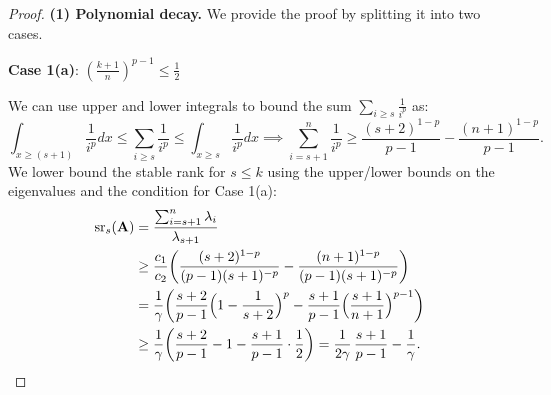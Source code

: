 \documentclass{article}
\begin{document}
\begin{proof}
  
  
  
\textbf{  (1) Polynomial decay.} We provide the proof by splitting it into two cases. 
  
  
  \textbf{Case 1(a)}: $\left(\frac{k+1}{n}\right)^{p-1} \leq \frac{1}{2} $
  
  We can use upper and lower integrals to bound the sum $\sum_{i\geq s}\frac{1}{i^p}$ as:
  \[ \int_{x\geq (s+1)}\frac{1}{i^p}dx \leq \sum_{i\geq
      s}\frac{1}{i^p} \leq \int_{x\geq s}\frac{1}{i^p}dx
    \implies \sum_{i=s+1}^n\frac{1}{i^p}
    \geq \frac{(s+2)^{1-p}}{p-1} -  \frac{(n+1)^{1-p}}{p-1}.\] 
  We lower bound the stable rank for $s\leq k$ using the upper/lower bounds on
  the eigenvalues and the condition for Case 1(a):
  \begin{align*}
    {\mathrm{sr}}_s(\mathbf A)&=\frac{\sum_{i=s+1}^n\lambda_i}{\lambda_{s+1}}\\
    &\geq
    \frac{c_1}{c_2}\bigg(\frac{(s+2)^{1-p}}{(p-1)(s+1)^{-p}}-
    \frac{(n+1)^{1-p}}{(p-1)(s+1)^{-p}}\bigg) \\
    &=\frac1\gamma\bigg(\frac{s+2}{p-1} \Big(1 - \frac1{s+2}\Big)^p
      -  \frac{s+1}{p-1}\Big(\frac{s+1}{n+1}\Big)^{p-1}\bigg)\\
    &\geq \frac1\gamma\bigg(\frac{s+2}{p-1} - 1
      -  \frac{s+1}{p-1}\cdot\frac12\bigg) = \frac1{2\gamma}\,\frac{s+1}{p-1}-\frac1\gamma.
  \end{align*}

  
  
  
  
  
  

\end{proof}
\end{document}
